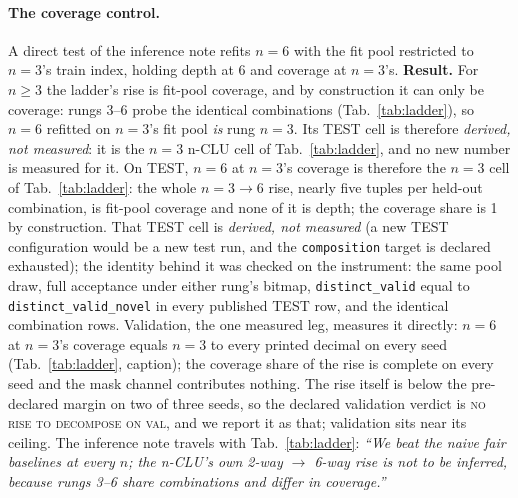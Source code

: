 \documentclass{article} %
\begin{document}
\paragraph{The coverage control.} A direct test of the inference note refits $n=6$ with the
fit pool restricted to $n=3$'s train index, holding depth at 6 and coverage at $n=3$'s.
\textbf{Result.} For $n\ge3$ the ladder's rise is fit-pool
coverage, and by construction it can only be coverage: rungs 3--6 probe the identical combinations (Tab.~\ref{tab:ladder}), %
so $n=6$ refitted on $n=3$'s fit pool \emph{is} rung $n=3$. Its TEST cell is therefore
\emph{derived, not measured}: it is the $n=3$ n-CLU cell of Tab.~\ref{tab:ladder}, and no new
number is measured for it. %
On TEST, $n=6$ at $n=3$'s coverage is therefore the $n=3$ cell of Tab.~\ref{tab:ladder}: %
the whole $n=3\to6$ rise, nearly five tuples per held-out combination, is fit-pool coverage and %
none of it is depth; the coverage share is 1 by construction. That TEST cell is \emph{derived, not
measured} (a new TEST configuration would be a new test run, and the \texttt{composition} target is
declared exhausted); the identity behind it was checked on the instrument: the same pool draw,
full acceptance under either rung's bitmap, \texttt{distinct\_valid} equal to %
\texttt{distinct\_valid\_novel} in every published TEST row, and the identical %
combination rows. Validation, the one measured leg, measures it %
directly: $n=6$ at $n=3$'s coverage equals $n=3$ to every printed decimal on every seed %
(Tab.~\ref{tab:ladder}, caption); the coverage %
share of the rise is complete on every seed and the mask channel contributes nothing. The rise itself %
is below the pre-declared margin on two of three seeds, so the %
declared validation verdict is \textsc{no rise to decompose on val}, and we report it as
that; validation sits near its ceiling. The inference note travels with %
Tab.~\ref{tab:ladder}: \emph{``We beat the naive fair baselines at every $n$; the n-CLU's own 2-way
$\to$ 6-way rise is not to be inferred, because rungs 3--6 share combinations and differ in coverage.''}
\end{document}

